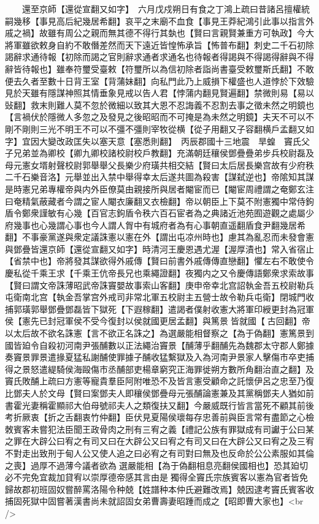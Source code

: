 　　還至京師【還從宣翻又如字】　六月戊戍朔日有食之丁鴻上疏曰昔諸呂擅權統嗣幾移【事見高后紀幾居希翻】哀平之末廟不血食【事見王莽紀鴻引此事以指言外戚之禍】故雖有周公之親而無其德不得行其埶也【賢曰言親賢兼重方可執政】今大將軍雖欲敕身自約不敢僭差然而天下遠近皆惶怖承旨【怖普布翻】刺史二千石初除謁辭求通待報【初除而謁之官則辭求通者求通名也待報者得謁與不得謁得辭與不得辭皆待報也】雖奉符璽受臺敕【符璽所以為信初除者詣尚書臺受敕璽斯氏翻】不敢便去久者至數十日背王室【背蒲妹翻】向私門此乃上威損下權盛也人道悖於下效驗見於天雖有隱謀神照其情垂象見戒以告人君【悖蒲内翻見賢遍翻】禁微則易【易以䜴翻】救末則難人莫不忽於微細以致其大恩不忍誨義不忍割去事之徵未然之明鏡也【言禍伏於隱微人多忽之及發見之後昭昭而不可掩是為未然之明鏡】夫天不可以不剛不剛則三光不明王不可以不彊不彊則宰牧從横【從子用翻又子容翻横戶孟翻又如字】宜因大變改政匡失以塞天意【塞悉則翻】　丙辰郡國十三地震　旱蝗　竇氏父子兄弟並為卿校【卿九卿校諸校尉校戶教翻】充滿朝廷穰侯鄧疊疊弟步兵校尉磊及母元憲女壻射聲校尉郭舉舉父長樂少府璜共相交結【賢曰太后居長樂宫故有少府秩二千石樂音洛】元舉並出入禁中舉得幸太后遂共圖為殺害【謀弑逆也】帝隂知其謀是時憲兄弟專權帝與内外臣僚莫由親接所與居者閹宦而已【閹宦周禮謂之奄鄭玄注曰奄精氣蔽藏者今謂之宦人閹衣廉翻又衣檢翻】帝以朝臣上下莫不附憲獨中常侍鉤盾令鄭衆謹敏有心幾【百官志鉤盾令秩六百石宦者為之典諸近池苑囿遊觀之處屬少府幾事也心幾謂心事也今人謂人胷中有城府者為有心事朝直遥翻盾食尹翻幾居希翻】不事豪黨遂與衆定議誅憲以憲在外【謂出屯凉州時也】慮其為亂忍而未發會憲與鄧疊皆還京師【還從宣翻又如字】時清河王慶恩遇尤渥【渥厚漬也】常入省宿止【省禁中也】帝將發其謀欲得外戚傳【賢曰前書外戚傳傳直戀翻】懼左右不敢使令慶私從千乘王求【千乘王伉帝長兄也乘繩證翻】夜獨内之又令慶傳語鄭衆求索故事【賢曰謂文帝誅薄昭武帝誅竇嬰故事索山客翻】庚申帝幸北宫詔執金吾五校尉勒兵屯衛南北宫【執金吾掌宫外戒司非常北軍五校尉主五營士故令勒兵屯衛】閉城門收捕郭璜郭舉鄧疊鄧磊皆下獄死【下遐稼翻】遣謁者僕射收憲大將軍印綬更封為冠軍侯【憲先已封冠軍侯不受今復封以侯就國更居孟翻】與篤景皆就國【古回翻】帝以太后故不欲名誅憲【言不欲正名誅之】為選嚴能相督察之【為于偽翻】憲篤景到國皆廹令自殺初河南尹張酺數以正法繩治竇景【酺薄乎翻酺先為魏郡太守郡人鄭據奏竇景罪景遣掾夏猛私謝酺使罪據子酺收猛繫獄及入為河南尹景家人擊傷市卒吏捕得之景怒遣緹騎侯海毆傷市丞酺部吏楊章窮究正海罪徙朔方數所角翻治直之翻】及竇氏敗酺上疏曰方憲等寵貴羣臣阿附唯恐不及皆言憲受顧命之託懷伊呂之忠至乃復比鄧夫人於文母【賢曰案鄧夫人即穰侯鄧疊母元張酺論憲兼及其黨稱鄧夫人猶如前書霍光妻稱霍顯祁大伯母號祁夫人之類復扶又翻】今嚴威既行皆言當死不顧其前後考折厥衷【折之舌翻衷竹仲翻】臣伏見夏陽侯瓌每存忠善前與臣言常有盡節之心檢敇賓客未嘗犯法臣聞王政骨肉之刑有三宥之義【禮記公族有罪獄成有司讞于公曰某之罪在大辟公曰宥之有司又曰在大辟公又曰宥之有司又曰在大辟公又曰宥之及三宥不對走出致刑于甸人公又使人追之曰必宥之有司對曰無及也反命於公公素服如其倫之喪】過厚不過薄今議者欲為選嚴能相【為于偽翻相息亮翻侯國相也】恐其廹切必不完免宜裁加貸宥以崇厚德帝感其言由是獨得全竇氏宗族賓客以憲為官者皆免歸故郡初班固奴嘗醉罵洛陽令种兢【姓譜种本仲氏避難改焉】兢因逮考竇氏賓客收捕固死獄中固嘗著漢書尚未就詔固女弟曹壽妻昭踵而成之【昭即曹大家也】<br />
